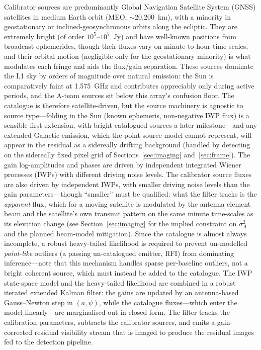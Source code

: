 \documentclass[11pt]{article}
\begin{document}
Calibrator sources are predominantly Global Navigation Satellite System (GNSS) satellites in medium Earth orbit (MEO, $\sim$20{,}200~km), with a minority in geostationary or inclined-geosynchronous orbits along the ecliptic. They are extremely bright (of order $10^5$--$10^7$~Jy) and have well-known positions from broadcast ephemerides, though their fluxes vary on minute-to-hour time-scales, and their orbital motion (negligible only for the geostationary minority) is what modulates each fringe and aids the flux/gain separation. These sources dominate the L1 sky by orders of magnitude over natural emission: the Sun is comparatively faint at 1.575~GHz and contributes appreciably only during active periods, and the A-team sources sit below this array's confusion floor. The catalogue is therefore satellite-driven, but the source machinery is agnostic to source type---folding in the Sun (known ephemeris, non-negative IWP flux) is a sensible first extension, with bright catalogued sources a later milestone---and any extended Galactic emission, which the point-source model cannot represent, will appear in the residual as a sidereally drifting background (handled by detecting on the sidereally fixed pixel grid of Sections~\ref{sec:imaging} and~\ref{sec:frame}). The gain log-amplitudes and phases are driven by independent integrated Wiener processes (IWPs) with different driving noise levels. The calibrator source fluxes are also driven by independent IWPs, with smaller driving noise levels than the gain parameters---though ``smaller'' must be qualified: what the filter tracks is the \emph{apparent} flux, which for a moving satellite is modulated by the antenna element beam and the satellite's own transmit pattern on the same minute time-scales as its elevation change (see Section~\ref{sec:imaging} for the implied constraint on $\sigma_A^2$ and the planned beam-model mitigation). Since the catalogue is almost always incomplete, a robust heavy-tailed likelihood is required to prevent un-modelled \emph{point-like} outliers (a passing un-catalogued emitter, RFI) from dominating inference---note that this mechanism handles sparse per-baseline outliers, not a bright coherent source, which must instead be added to the catalogue. The IWP state-space model and the heavy-tailed likelihood are combined in a robust iterated extended Kalman filter: the gains are updated by an antenna-based Gauss--Newton step in $(a,\psi)$, while the catalogue fluxes---which enter the model linearly---are marginalised out in closed form. The filter tracks the calibration parameters, subtracts the calibrator sources, and emits a gain-corrected residual visibility stream that is imaged to produce the residual images fed to the detection pipeline.
\end{document}
